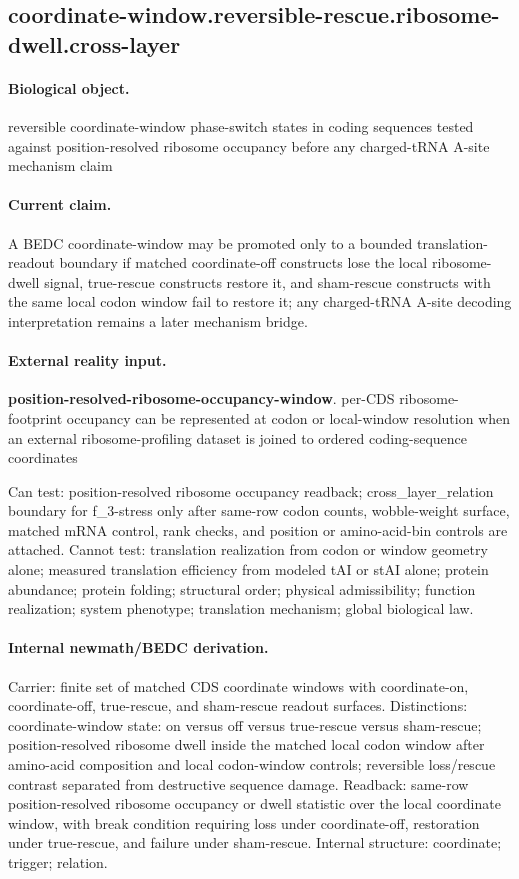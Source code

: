 \subsection{coordinate-window.reversible-rescue.ribosome-dwell.cross-layer}

\paragraph{Biological object.} reversible coordinate-window phase-switch states in coding sequences tested against position-resolved ribosome occupancy before any charged-tRNA A-site mechanism claim

\paragraph{Current claim.} A BEDC coordinate-window may be promoted only to a bounded translation-readout boundary if matched coordinate-off constructs lose the local ribosome-dwell signal, true-rescue constructs restore it, and sham-rescue constructs with the same local codon window fail to restore it; any charged-tRNA A-site decoding interpretation remains a later mechanism bridge.

\paragraph{External reality input.}
\textbf{position-resolved-ribosome-occupancy-window}. per-CDS ribosome-footprint occupancy can be represented at codon or local-window resolution when an external ribosome-profiling dataset is joined to ordered coding-sequence coordinates

Can test: position-resolved ribosome occupancy readback; cross\_layer\_relation boundary for f\_3-stress only after same-row codon counts, wobble-weight surface, matched mRNA control, rank checks, and position or amino-acid-bin controls are attached. Cannot test: translation realization from codon or window geometry alone; measured translation efficiency from modeled tAI or stAI alone; protein abundance; protein folding; structural order; physical admissibility; function realization; system phenotype; translation mechanism; global biological law.

\paragraph{Internal newmath/BEDC derivation.} Carrier: finite set of matched CDS coordinate windows with coordinate-on, coordinate-off, true-rescue, and sham-rescue readout surfaces. Distinctions: coordinate-window state: on versus off versus true-rescue versus sham-rescue; position-resolved ribosome dwell inside the matched local codon window after amino-acid composition and local codon-window controls; reversible loss/rescue contrast separated from destructive sequence damage. Readback: same-row position-resolved ribosome occupancy or dwell statistic over the local coordinate window, with break condition requiring loss under coordinate-off, restoration under true-rescue, and failure under sham-rescue. Internal structure: coordinate; trigger; relation.


